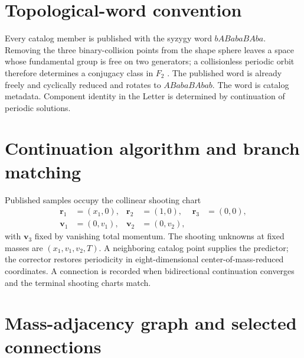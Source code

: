 \documentclass[aps,prl,onecolumn,amsmath,amssymb]{revtex4-2}
\begin{document}
\section{Topological-word convention}

Every catalog member is published with the syzygy word $bABabaBAba$. Removing
the three binary-collision points from the shape sphere leaves a space whose
fundamental group is free on two generators; a collisionless periodic orbit
therefore determines a conjugacy class in $F_2$
\cite{montgomery1995geometricphase,moeckel2012regularization}. The published
word is already freely and cyclically reduced and rotates to $ABabaBAbab$. The
word is catalog metadata. Component identity in the Letter is determined by
continuation of periodic solutions.

\section{Continuation algorithm and branch matching}

Published samples occupy the collinear shooting chart
\begin{equation}
\begin{aligned}
\mathbf r_1&=(x_1,0),& \mathbf r_2&=(1,0),& \mathbf r_3&=(0,0),\\
\mathbf v_1&=(0,v_1),& \mathbf v_2&=(0,v_2),
\end{aligned}
\end{equation}
with $\mathbf v_3$ fixed by vanishing total momentum. The shooting unknowns at
fixed masses are $(x_1,v_1,v_2,T)$. A neighboring catalog point supplies the
predictor; the corrector restores periodicity in eight-dimensional
center-of-mass-reduced coordinates. A connection is recorded when
bidirectional continuation converges and the terminal shooting charts match.

\section{Mass-adjacency graph and selected connections}
\end{document}

